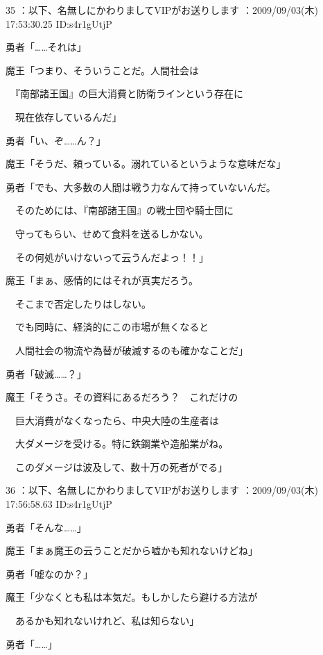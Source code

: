 \documentclass[a4j,twocolumn]{tarticle}
\begin{document}
	
    
    

35 ：以下、名無しにかわりましてVIPがお送りします ：2009/09/03(木) 17:53:30.25 ID:s4r1gUtjP 


勇者「……それは」\par{} 
魔王「つまり、そういうことだ。人間社会は\par{} 
　『南部諸王国』の巨大消費と防衛ラインという存在に\par{} 
　現在依存しているんだ」\par{} 
勇者「い、ぞ……ん？」 



魔王「そうだ、頼っている。溺れているというような意味だな」 



勇者「でも、大多数の人間は戦う力なんて持っていないんだ。\par{} 
　そのためには、『南部諸王国』の戦士団や騎士団に\par{} 
　守ってもらい、せめて食料を送るしかない。\par{} 
　その何処がいけないって云うんだよっ！！」 



魔王「まぁ、感情的にはそれが真実だろう。\par{} 
　そこまで否定したりはしない。\par{} 
　でも同時に、経済的にこの市場が無くなると\par{} 
　人間社会の物流や為替が破滅するのも確かなことだ」 



勇者「破滅……？」\par{} 
魔王「そうさ。その資料にあるだろう？　これだけの\par{} 
　巨大消費がなくなったら、中央大陸の生産者は \par{}
　大ダメージを受ける。特に鉄鋼業や造船業がね。\par{} 
　このダメージは波及して、数十万の死者がでる」

	

	

36 ：以下、名無しにかわりましてVIPがお送りします ：2009/09/03(木) 17:56:58.63 ID:s4r1gUtjP 


勇者「そんな……」\par{} 
魔王「まぁ魔王の云うことだから嘘かも知れないけどね」\par{} 
勇者「嘘なのか？」\par{} 
魔王「少なくとも私は本気だ。もしかしたら避ける方法が \par{}
　あるかも知れないけれど、私は知らない」\par{} 
勇者「……」 
\end{document}
